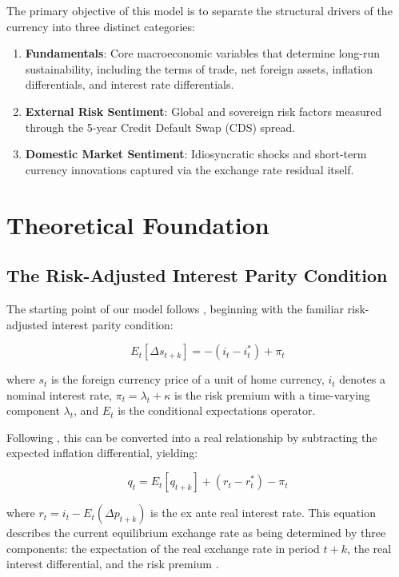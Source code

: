 \documentclass[11pt,a4paper]{article}
\begin{document}
The primary objective of this model is to separate the structural drivers of the currency into three distinct categories:

\begin{enumerate}[label=\textbf{\arabic*.}]
    \item \textbf{Fundamentals}: Core macroeconomic variables that determine long-run sustainability, including the terms of trade, net foreign assets, inflation differentials, and interest rate differentials.
    \item \textbf{External Risk Sentiment}: Global and sovereign risk factors measured through the 5-year Credit Default Swap (CDS) spread.
    \item \textbf{Domestic Market Sentiment}: Idiosyncratic shocks and short-term currency innovations captured via the exchange rate residual itself.
\end{enumerate}

\section{Theoretical Foundation}

\subsection{The Risk-Adjusted Interest Parity Condition}

The starting point of our model follows \cite{ClarkMacDonald1998}, beginning with the familiar risk-adjusted interest parity condition:

\begin{equation}
E_t[\Delta s_{t+k}] = -(i_t - i_t^*) + \pi_t
\label{eq:risk_adjusted_interest_parity}
\end{equation}

where $s_t$ is the foreign currency price of a unit of home currency, $i_t$ denotes a nominal interest rate, $\pi_t = \lambda_t + \kappa$ is the risk premium with a time-varying component $\lambda_t$, and $E_t$ is the conditional expectations operator.

Following \cite{ClarkMacDonald1998}, this can be converted into a real relationship by subtracting the expected inflation differential, yielding:

\begin{equation}
q_t = E_t[q_{t+k}] + (r_t - r_t^*) - \pi_t
\label{eq:real_interest_parity}
\end{equation}

where $r_t = i_t - E_t(\Delta p_{t+k})$ is the ex ante real interest rate. This equation describes the current equilibrium exchange rate as being determined by three components: the expectation of the real exchange rate in period $t+k$, the real interest differential, and the risk premium \citep{ClarkMacDonald1998}.
\end{document}
